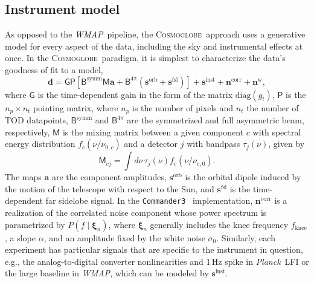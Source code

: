 \documentclass[twocolumn]{../../common/aa}
\def\WMAP{\emph{WMAP}}
\def\Planck{\emph{Planck}}
\def\commanderthree{\texttt{Commander3}}
\newcommand{\cosmoglobe}{\textsc{Cosmoglobe}}
\begin{document}
\subsection{Instrument model}
\label{sec:wmap_instmodel}

As opposed to the \WMAP\ pipeline, the \cosmoglobe\ approach uses a generative model for every aspect of the data, including the sky and instrumental effects at once.
In the \cosmoglobe\ paradigm, it is simplest to characterize the data's goodness of fit to a model,
\begin{equation}
	\label{eq:model}
	\boldsymbol d =\mathsf G\mathsf P[\mathsf B^\mathrm{symm}\mathsf M\boldsymbol a+\mathsf B^\mathrm{4\pi}(\boldsymbol s^\mathrm{orb}
	+\boldsymbol s^\mathrm{fsl})] + \boldsymbol s^\mathrm{inst}+\boldsymbol n^\mathrm{corr}+\boldsymbol n^\mathrm w,
\end{equation}
where $\mathsf G$ is the time-dependent gain in the form of the matrix $\mathrm{diag}(g_t)$, $\mathsf P$ is the $n_p\times n_t$ pointing matrix, where $n_p$ is the number of pixels and $n_t$ the number of TOD datapoints,
$\mathsf B^\mathrm{symm}$ and $\mathsf B^{4\pi}$ are the symmetrized and full asymmetric beam, respectively, $\mathsf M$ is the mixing matrix between a given component $c$ with spectral energy distribution $f_c(\nu/\nu_{0,c})$ and a detector $j$ with bandpass $\tau_j(\nu)$, given by
\begin{equation}
	\mathsf M_{cj}=\int d\nu\,\tau_j(\nu)f_c(\nu/\nu_{c,0}).
\end{equation}
The maps $\boldsymbol a$ are the component amplitudes, $\boldsymbol s^\mathrm{orb}$ is the orbital dipole induced by the motion of the telescope with respect to the Sun, and $\boldsymbol s^\mathrm{fsl}$ is the time-dependent far sidelobe signal. In the \commanderthree\ \citep{bp03} implementation, $\boldsymbol n^\mathrm{corr}$ is a realization of the correlated noise component whose power spectrum is parametrized by $P(f\mid\boldsymbol\xi_n)$, where $\boldsymbol\xi_n$ generally includes the knee frequency $f_\mathrm{knee}$, a slope $\alpha$, and an amplitude fixed by the white noise $\sigma_0$. 
Similarly, each experiment has particular signals that are specific to the instrument in question, e.g., the analog-to-digital converter nonlinearities \citep{bp25} and 1\,Hz spike in \Planck\ LFI or the large baseline in \WMAP, which can be modeled by $\boldsymbol s^\mathrm{inst}$. 
\end{document}
